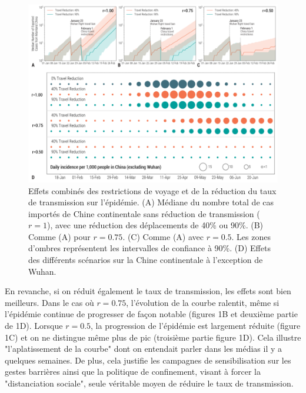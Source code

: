 \documentclass[12pt, a4paper]{article}
\begin{document}
\begin{figure}[!h]
    \centering
    \includegraphics[width=.9\textwidth]{results_effect_travel_ban.png}
    \caption{Effets combinés des restrictions de voyage et de la réduction du taux de transmission sur l'épidémie. (A) Médiane du nombre total de cas importés de Chine continentale sans réduction de transmission ($r=1$), avec une réduction des déplacements de 40\% ou 90\%. (B) Comme (A) pour $r = 0.75$. (C) Comme (A) avec $r = 0.5$. Les zones d'ombres représentent les intervalles de confiance à 90\%. (D) Effets des différents scénarios sur la Chine continentale à l'exception de Wuhan.}
    \label{fig:results-effect-travel-ban}
\end{figure}

En revanche, si on réduit également le taux de transmission, les effets sont bien meilleurs. Dans le cas où $r=0.75$, l'évolution de la courbe ralentit, même si l'épidémie continue de progresser de façon notable (figures 1B et deuxième partie de 1D). Lorsque $r=0.5$, la progression de l'épidémie est largement réduite (figure 1C) et on ne distingue même plus de pic (troisième partie figure 1D). Cela illustre "l'aplatissement de la courbe" dont on entendait parler dans les médias il y a quelques semaines. De plus, cela justifie les campagnes de sensibilisation sur les gestes barrières ainsi que la politique de confinement, visant à forcer la "distanciation sociale", seule véritable moyen de réduire le taux de transmission.



\end{document}
